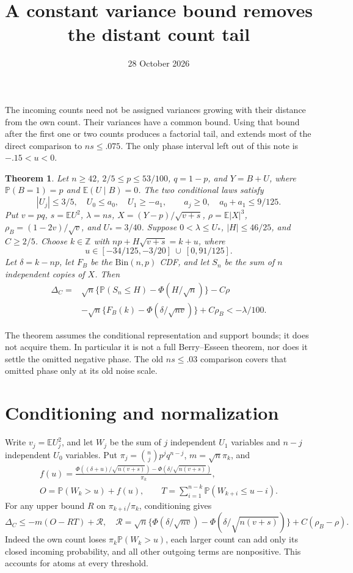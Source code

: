 \documentclass[11pt]{article}
\title{A constant variance bound removes the distant count tail}
\author{}\date{28 October 2026}
\newtheorem{theorem}{Theorem}\newtheorem{lemma}[theorem]{Lemma}
\newcommand{\E}{\mathbb E}\newcommand{\Pp}{\mathbb P}
\begin{document}
\maketitle

The incoming counts need not be assigned variances growing with their
distance from the own count. Their variances have a common bound. Using
that bound after the first one or two counts produces a factorial tail,
and extends most of the direct comparison to $ns\le .075$. The only
phase interval left out of this note is $-.15<u<0$.

\begin{theorem}\label{thm:outer}
Let $n\ge42$, $2/5\le p\le53/100$, $q=1-p$, and $Y=B+U$, where
$\Pp(B=1)=p$ and $\E(U\mid B)=0$. The two conditional laws satisfy
\[
 |U_j|\le3/5,\quad U_0\le a_0,\quad U_1\ge-a_1,
 \qquad a_j\ge0,\quad a_0+a_1\le9/125.
\]
Put $v=pq$, $s=\E U^2$, $\lambda=ns$, $X=(Y-p)/\sqrt{v+s}$,
$\rho=\E|X|^3$, $\rho_B=(1-2v)/\sqrt v$, and $U_*=3/40$.
Suppose $0<\lambda\le U_*$, $|H|\le46/25$, and $C\ge2/5$.
Choose $k\in\mathbb Z$ with $np+H\sqrt{v+s}=k+u$, where
\[
 u\in[-34/125,-3/20]\ \cup\ [0,91/125].
\]
Let $\delta=k-np$, let $F_B$ be the $\mathrm{Bin}(n,p)$ CDF, and
let $S_n$ be the sum of $n$ independent copies of $X$. Then
\begin{align*}
 \Delta_C={}&\sqrt n\{\Pp(S_n\le H)-\Phi(H/\sqrt n)\}-C\rho\\
 &-\sqrt n\{F_B(k)-\Phi(\delta/\sqrt{nv})\}+C\rho_B
 <-\lambda/100.
\end{align*}
\end{theorem}
The theorem assumes the conditional representation and support bounds;
it does not acquire them. In particular it is not a full Berry--Esseen
theorem, nor does it settle the omitted negative phase. The old $ns\le.03$
comparison covers that omitted phase only at its old noise scale.

\section{Conditioning and normalization}
Write $v_j=\E U_j^2$, and let $W_j$ be the sum of $j$ independent
$U_1$ variables and $n-j$ independent $U_0$ variables. Put
$\pi_j=\binom njp^jq^{n-j}$, $m=\sqrt n\pi_k$, and
\begin{gather*}
 f(u)=\frac{\Phi((\delta+u)/\sqrt{n(v+s)})-
                  \Phi(\delta/\sqrt{n(v+s)})}{\pi_k},\\
 O=\Pp(W_k>u)+f(u),\qquad
 T=\sum_{i=1}^{n-k}\Pp(W_{k+i}\le u-i).
\end{gather*}
For any upper bound $R$ on $\pi_{k+i}/\pi_k$, conditioning gives
\begin{equation}\label{eq:master}
 \Delta_C\le-m(O-RT)+\mathcal R,
 \quad \mathcal R=\sqrt n\{\Phi(\delta/\sqrt{nv})-
 \Phi(\delta/\sqrt{n(v+s)})\}+C(\rho_B-\rho).
\end{equation}
Indeed the own count loses $\pi_k\Pp(W_k>u)$, each larger count
can add only its closed incoming probability, and all other outgoing
terms are nonpositive. This accounts for atoms at every threshold.
\end{document}
